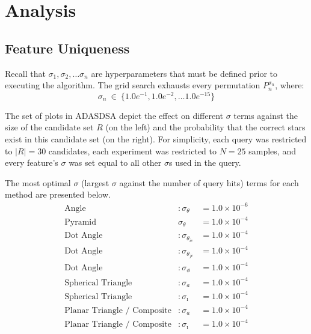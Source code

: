 \section{Analysis}\label{sec:analysis}

\subsection{Feature Uniqueness}\label{subsec:featureUniquenessAnalysis}
Recall that $\sigma_1, \sigma_2, \ldots \sigma_n$ are hyperparameters that must be defined prior to executing the
algorithm.
The grid search exhausts every permutation $P_n^{\sigma_n}$, where:
\begin{equation}
    \label{eq:gridSearchEpsilon}
    \sigma_n \ \in \ \{1.0e^{-1}, 1.0e^{-2}, \ldots 1.0e^{-15}\}
\end{equation}

The set of plots in ADASDSA depict the effect on different $\sigma$ terms against the size of the candidate set $R$
(on the left) and the probability that the correct stars exist in this candidate set (on the right).
For simplicity, each query was restricted to $|R|=30$ candidates, each experiment was restricted to $N=25$ samples, and
every feature's $\sigma$ was set equal to all other $\sigma$s used in the query.



The most optimal $\sigma$ (largest $\sigma$ against the number of query hits) terms for each method are presented
below.
\begin{align*}
    \text{Angle}&: \sigma_\theta &= 1.0 \times 10^{-6}\\
    \text{Pyramid}& \sigma_\theta &= 1.0 \times 10^{-4}\\
    \text{Dot Angle}&: \sigma_{\theta_{ic}} &= 1.0 \times 10^{-4}\\
    \text{Dot Angle}&: \sigma_{\theta_{jc}} &= 1.0 \times 10^{-4}\\
    \text{Dot Angle}&: \sigma_\phi &= 1.0 \times 10^{-4}\\
    \text{Spherical Triangle}&: \sigma_a &= 1.0 \times 10^{-4}\\
    \text{Spherical Triangle}&: \sigma_\imath &= 1.0 \times 10^{-4}\\
    \text{Planar Triangle / Composite}&: \sigma_a &= 1.0 \times 10^{-4} \\
    \text{Planar Triangle / Composite}&: \sigma_\imath &= 1.0 \times 10^{-4}\\
\end{align*}

